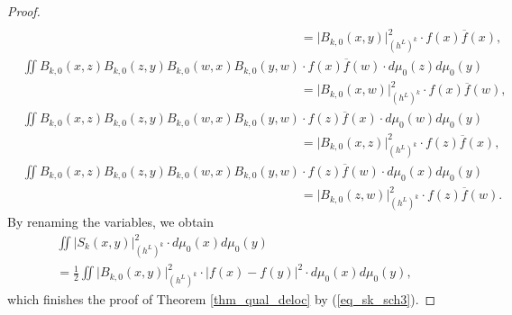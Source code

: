 \documentclass[12pt]{article}
\numberwithin{equation}{section}
\theoremstyle{theorem}
\theoremstyle{definition}
\theoremstyle{remark}
\begin{document}
\begin{proof}
\begin{equation}
\begin{aligned}
			\\
			&
			\qquad \qquad \qquad \qquad \qquad \qquad\qquad \qquad \qquad \qquad \qquad
			= \big| B_{k, 0}(x, y) \big|^2_{(h^L)^k} \cdot f(x) \overline{f}(x),	
			\\
			&\iint B_{k, 0}(x, z) B_{k, 0}(z, y) B_{k, 0}(w, x) B_{k, 0}(y, w) \cdot f(x) \overline{f}(w) \cdot  d \mu_0(z) d \mu_0(y)
			\\
			&
			\qquad \qquad \qquad \qquad \qquad \qquad\qquad \qquad \qquad \qquad \qquad
			= \big| B_{k, 0}(x, w) \big|^2_{(h^L)^k} \cdot f(x) \overline{f}(w),		
			\\
			&\iint B_{k, 0}(x, z) B_{k, 0}(z, y) B_{k, 0}(w, x) B_{k, 0}(y, w) \cdot f(z) \overline{f}(x) \cdot  d \mu_0(w) d \mu_0(y)
			\\
			&
			\qquad \qquad \qquad \qquad \qquad \qquad\qquad \qquad \qquad \qquad \qquad
			= \big| B_{k, 0}(x, z) \big|^2_{(h^L)^k} \cdot f(z) \overline{f}(x),		
			\\
			&\iint B_{k, 0}(x, z) B_{k, 0}(z, y) B_{k, 0}(w, x) B_{k, 0}(y, w) \cdot f(z) \overline{f}(w) \cdot  d \mu_0(x) d \mu_0(y)
			\\
			&
			\qquad \qquad \qquad \qquad \qquad \qquad\qquad \qquad \qquad \qquad \qquad
			= \big| B_{k, 0}(z, w) \big|^2_{(h^L)^k} \cdot f(z) \overline{f}(w).	
		\end{aligned}
		\end{equation}
		By renaming the variables, we obtain
		\begin{multline}\label{eq_sk_sch6}
			\iint \big| S_k(x, y) \big|^2_{(h^L)^k}  \cdot  d \mu_0(x) d \mu_0(y) 
			\\
			=
			\frac{1}{2}
			\iint \big| B_{k, 0}(x, y) \big|^2_{(h^L)^k} \cdot \big| f(x) - f(y) \big|^2 \cdot d \mu_0(x) d \mu_0(y),
		\end{multline}
		which finishes the proof of Theorem \ref{thm_qual_deloc} by (\ref{eq_sk_sch3}).
	\end{proof}
	
\end{document}
